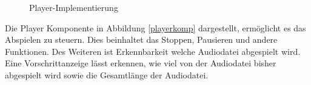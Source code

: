 \begin{figure}[ht]
\begin{minipage}[b]{0.45\linewidth}
\caption{Player-Implementierung}
\label{player}
\end{minipage}
\end{figure}

Die Player Komponente in Abbildung \ref{playerkomp} dargestellt, ermöglicht es das Abspielen zu steuern. Dies beinhaltet das Stoppen, Pausieren und andere Funktionen. Des Weiteren ist Erkennbarkeit welche Audiodatei abgespielt wird. Eine Vorschrittanzeige lässt erkennen, wie viel von der Audiodatei bisher abgespielt wird sowie die Gesamtlänge der Audiodatei.

